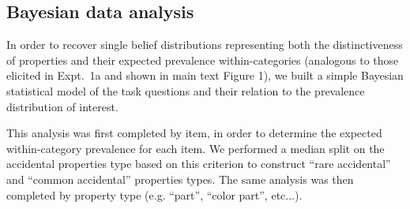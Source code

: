 \documentclass[10pt,letterpaper]{article}
\begin{document}
\subsection{Bayesian data analysis}
\label{sec:bda2}

In order to recover single belief distributions representing both the distinctiveness of properties and their expected prevalence within-categories (analogous to those elicited in Expt.~1a and shown in main text Figure 1), we built a simple Bayesian statistical model of the task questions and their relation to the prevalence distribution of interest. 

This analysis was first completed by item, in order to determine the expected within-category prevalence for each item. 
We performed a median split on the accidental properties type based on this criterion to construct ``rare accidental'' and ``common accidental'' properties types. 
The same analysis was then completed by property type (e.g. ``part'', ``color part'', etc...).
\end{document}
